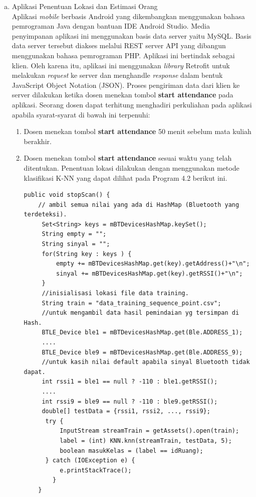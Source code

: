 \begin{enumerate}[a.]
\begin{enumerate}[a.]
\item Aplikasi Penentuan Lokasi dan Estimasi Orang
\\ Aplikasi \textit{mobile} berbasis Android yang dikembangkan menggunakan bahasa pemrograman Java dengan bantuan IDE Android Studio. Media penyimpanan aplikasi ini menggunakan basis data server yaitu MySQL. Basis data server tersebut diakses melalui REST server API yang dibangun menggunakan bahasa pemrograman PHP. Aplikasi ini bertindak sebagai klien. Oleh karena itu, aplikasi ini menggunakan \textit{library} Retrofit untuk melakukan \textit{request} ke server dan menghandle \textit{response} dalam bentuk JavaScript Object Notation (JSON). Proses pengiriman data dari klien ke server dilakukan ketika dosen menekan tombol \textbf{start attendance} pada aplikasi. %
Seorang dosen dapat terhitung menghadiri perkuliahan pada aplikasi apabila syarat-syarat di bawah ini terpenuhi:
\begin{enumerate}[1.]
	\item Dosen menekan tombol \textbf{start attendance} 50 menit sebelum mata kuliah berakhir.
	\item Dosen menekan tombol \textbf{start attendance} sesuai waktu yang telah ditentukan. Penentuan lokasi dilakukan dengan menggunakan metode klasifikasi K-NN yang dapat dilihat pada Program 4.2 berikut ini.
	      \vspace{0.4cm}
	      \begin{lstlisting}[label=programKNNDosen]
	public void stopScan() {
    // ambil semua nilai yang ada di HashMap (Bluetooth yang terdeteksi).
     Set<String> keys = mBTDevicesHashMap.keySet();
     String empty = "";
     String sinyal = "";
     for(String key : keys ) {
         empty += mBTDevicesHashMap.get(key).getAddress()+"\n";
         sinyal += mBTDevicesHashMap.get(key).getRSSI()+"\n";
     }
     //inisialisasi lokasi file data training.
     String train = "data_training_sequence_point.csv";
     //untuk mengambil data hasil pemindaian yg tersimpan di Hash.
     BTLE_Device ble1 = mBTDevicesHashMap.get(Ble.ADDRESS_1);
     ....  
     BTLE_Device ble9 = mBTDevicesHashMap.get(Ble.ADDRESS_9);
     //untuk kasih nilai default apabila sinyal Bluetooth tidak dapat.
     int rssi1 = ble1 == null ? -110 : ble1.getRSSI();
     ....
     int rssi9 = ble9 == null ? -110 : ble9.getRSSI();
     double[] testData = {rssi1, rssi2, ..., rssi9};
      try {
          InputStream streamTrain = getAssets().open(train);
          label = (int) KNN.knn(streamTrain, testData, 5);
          boolean masukKelas = (label == idRuang);
      } catch (IOException e) {
          e.printStackTrace();
       	}
    }
    

\end{lstlisting}
\end{enumerate}
\end{enumerate}
\end{enumerate}
